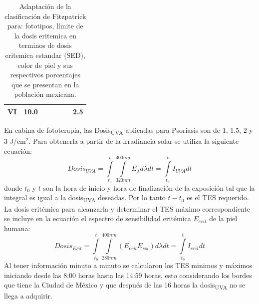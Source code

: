 \documentclass{article}
\begin{document}
\begin{multicols}{2}
\begin{center}
\begin{table}[H]
\begin{tabulary}{1.0\linewidth}{ccccccc}
        VI 	&10.0 	&	&  &	&	&2.5	\\ \hline
    \end{tabulary}
    \caption{{Adaptación de la clasificación de Fitzpatrick para: fototipos, límite de la dosis eritemica en terminos de dosis eritemica estandar (SED), color de piel y sus respectivos porcentajes que se presentan en la población mexicana.{\label{fig:fototipo}}}}
    \end{table}
\end{center}
 \vspace{-0.5cm}
En cabina de fototerapia, las Dosis\textsubscript{UVA} aplicadas para Psoriasis son de 1, 1.5, 2 y 3 J/cm$^2$. 
Para obtenerla a partir de la irradiancia solar se utiliza la siguiente ecuación:
\begin{equation*}
    Dosis_{UVA}=\int\limits_{t_0}^t\int\limits_{320nm}^{400nm} E_{\lambda} d\lambda dt =\int\limits_{t_0}^{t}I_{UVA}dt
\end{equation*}
donde $t_0$ y $t$ son la hora de inicio y hora de finalización de la exposición tal que la integral es igual a la dosis\textsubscript{UVA} deseadas.
Por lo tanto $t-t_0$ es el TES requerido. La dosis eritémica para alcanzarla y determinar el TES máximo correspondiente se incluye en la ecuación el espectro de sensibilidad eritémica $E_{erit}$ de la piel humana:
\begin{equation*}
    Dosis_{Erit}=\int\limits_{t_0}^{t} \int\limits_{280nm}^{400nm} \left( E_{erit}E_{sol}\right)d\lambda dt = \int\limits_{t_0}^{t}I_{erit}dt
\end{equation*}
Al tener información minuto a minuto se calcularon los TES minimos y máximos iniciando desde las 8:00 horas hasta las 14:59 horas, esto considerando los bordes que tiene la Ciudad de México y que después de las 16 horas la dosis\textsubscript{UVA} no se llega a adquirir.\\

\end{multicols}
\end{document}
